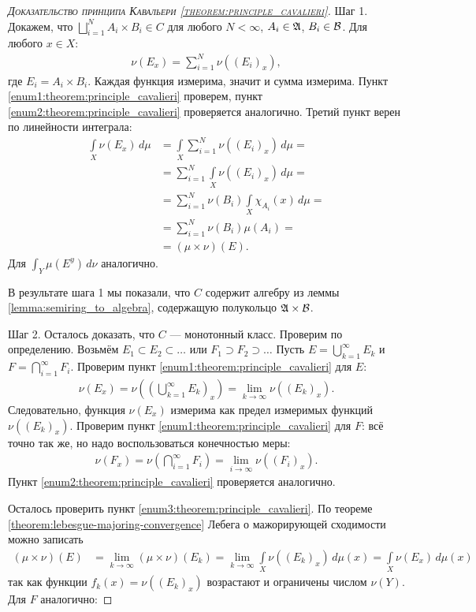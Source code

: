 \begin{proof}[\normalfont\textsc{Доказательство принципа Кавальери \ref{theorem:principle_cavalieri}}]
 Шаг 1. Докажем, что $\bigsqcup_{i=1}^{N} A_i \times B_i \in C $  для любого $N < \infty$, $A_i \in \mathfrak{A}$, $B_i \in \mathcal{B}$. Для любого $x \in X$: \begin{align*}
  \nu(E_x) = \sum_{i=1}^{N} \nu((E_{i})_x)
 ,\end{align*} где $E_i = A_i \times B_i$. Каждая функция измерима, значит и сумма измерима. Пункт \ref{enum1:theorem:principle_cavalieri} проверем, пункт \ref{enum2:theorem:principle_cavalieri} проверяется аналогично. Третий пункт верен по линейности интеграла: \begin{align*}
 \int\limits_{X} \nu(E_x) \, d\mu  &= \int\limits_{X} \sum_{i=1}^{N} \nu((E_i)_x) \, d\mu  = \\
 &= \sum_{i=1}^{N} \int\limits_{X} \nu((E_i)_x) \, d\mu  = \\
 &= \sum_{i=1}^{N} \nu(B_i) \int\limits_{X} \chi_{A_i}(x) \, d\mu  = \\
 &= \sum_{i=1}^{N} \nu(B_i) \mu(A_i)= \\
 &= (\mu \times \nu)(E)
 .\end{align*} Для $\int_{Y} \mu(E^{y}) \, d\nu $ аналогично.

 В результате шага 1 мы показали, что $C$ содержит алгебру из леммы \ref{lemma:semiring_to_algebra}, содержащую полукольцо $\mathfrak{A} \times \mathcal{B}$.

 Шаг 2. Осталось доказать, что $C$  --- монотонный класс. Проверим по определению. Возьмём $E_1 \subset E_2 \subset \ldots$  или $F_1 \supset F_2 \supset \ldots$  Пусть $E = \bigcup_{k=1}^{\infty} E_k$ и $F = \bigcap_{i=1}^{\infty} F_i $. Проверим пункт \ref{enum1:theorem:principle_cavalieri} для $E$: \begin{align*}
  \nu (E_x) = \nu \left( \left( \bigcup_{k=1}^{\infty} E_k \right)_x \right) = \lim_{k \to \infty} \nu((E_{k})_x)
  .\end{align*} Следовательно, функция $\nu(E_x)$ измерима как предел измеримых функций $\nu((E_k)_x)$. Проверим пункт \ref{enum1:theorem:principle_cavalieri} для $F$: всё точно так же, но надо воспользоваться конечностью меры: \begin{align*}
 \nu(F_x) = \nu \left( \bigcap_{i=1}^{\infty} F_i \right) = \lim_{i \to \infty} \nu((F_{i})_x) 
.\end{align*} Пункт \ref{enum2:theorem:principle_cavalieri} проверяется аналогично.

Осталось проверить пункт \ref{enum3:theorem:principle_cavalieri}. По теореме \ref{theorem:lebesgue-majoring-convergence} Лебега о мажорирующей сходимости можно записать \begin{align*}
  (\mu \times \nu)(E) &= \lim_{k \to \infty} (\mu \times \nu)(E_k) = \lim_{k \to \infty} \int\limits_{X} \nu((E_{k})_x) \, d\mu   (x) =  \int\limits_{X} \nu(E_x)  \, d\mu  (x)
 \end{align*} так как функции $f_k(x) = \nu((E_k)_x)$ возрастают и ограничены числом $\nu(Y)$. Для $F$ аналогично:


\end{proof}
